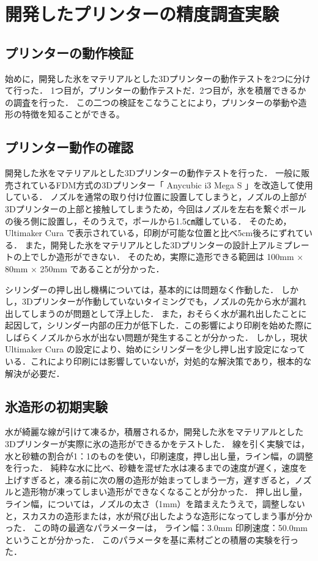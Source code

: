 \chapter{開発したプリンターの精度調査実験}
\label{chp:first}

\section{プリンターの動作検証}
\label{sec:paragraph}
始めに，開発した氷をマテリアルとした3Dプリンターの動作テストを2つに分けて行った．
1つ目が，プリンターの動作テストだ．2つ目が，氷を積層できるかの調査を行った．
この二つの検証をこなうことにより，プリンターの挙動や造形の特徴を知ることができる。

\section{プリンター動作の確認}
\label{sec:paragraph}
開発した氷をマテリアルとした3Dプリンターの動作テストを行った．
一般に販売されているFDM方式の3Dプリンター「 Anycubic i3 Mega S 」を改造して使用している．
ノズルを通常の取り付け位置に設置してしまうと，ノズルの上部が3Dプリンターの上部と接触してしまうため，今回はノズルを左右を繋ぐポールの後ろ側に設置し，そのうえで，ポールから1.5㎝離している．
そのため， Ultimaker Cura で表示されている，印刷が可能な位置と比べ5cm後ろにずれている．
また，開発した氷をマテリアルとした3Dプリンターの設計上アルミプレートの上でしか造形ができない．
そのため，実際に造形できる範囲は 100mm × 80mm × 250mm であることが分かった．

シリンダーの押し出し機構については，基本的には問題なく作動した．
しかし，3Dプリンターが作動していないタイミングでも，ノズルの先から水が漏れ出してしまうのが問題として浮上した．
また，おそらく水が漏れ出したことに起因して，シリンダー内部の圧力が低下した．この影響により印刷を始めた際にしばらくノズルから水が出ない問題が発生することが分かった．
しかし，現状 Ultimaker Cura の設定により、始めにシリンダーを少し押し出す設定になっている．これにより印刷には影響していないが，対処的な解決策であり，根本的な解決が必要だ．


\section{氷造形の初期実験}
\label{sec:paragraph}
水が綺麗な線が引けて凍るか，積層されるか，開発した氷をマテリアルとした3Dプリンターが実際に氷の造形ができるかをテストした．
線を引く実験では，水と砂糖の割合が1：1のものを使い，印刷速度，押し出し量，ライン幅，の調整を行った．
純粋な水に比べ、砂糖を混ぜた水は凍るまでの速度が遅く，速度を上げすぎると，凍る前に次の層の造形が始まってしまう一方，遅すぎると，ノズルと造形物が凍ってしまい造形ができなくなることが分かった．
押し出し量，ライン幅，については，ノズルの太さ（1mm）を踏まえたうえで，調整しないと，スカスカの造形または，水が飛び出したような造形になってしまう事が分かった．
この時の最適なパラメーターは， ライン幅：3.0mm 印刷速度：50.0mmということが分かった．
このパラメータを基に素材ごとの積層の実験を行った．


